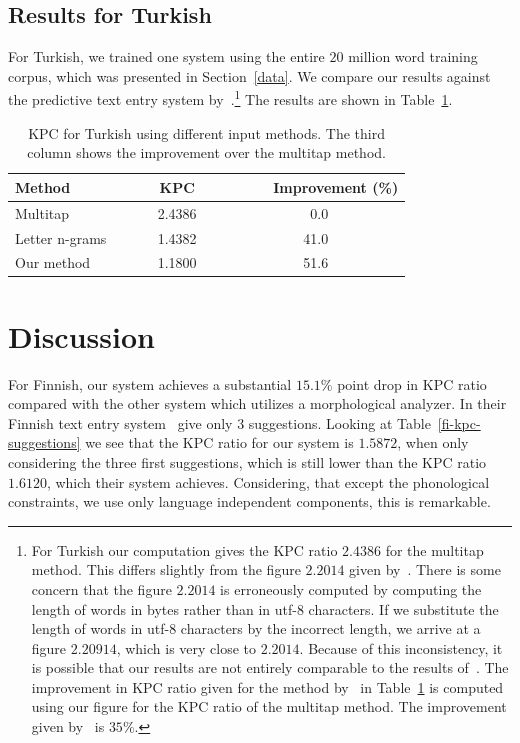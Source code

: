 \documentclass{llncs}
\begin{document}
\subsection{Results for Turkish}

For Turkish, we trained one system using the entire $20$ million word
training corpus, which was presented in Section~\ref{data}. We compare
our results against the predictive text entry system
by~\cite{Tantug:2010}.\footnote{For Turkish our computation gives the
  KPC ratio $2.4386$ for the multitap method. This differs slightly
  from the figure $2.2014$ given by~\cite{Tantug:2010}. There is some
  concern that the figure $2.2014$ is erroneously computed by
  computing the length of words in bytes rather than in utf-8
  characters. If we substitute the length of words in utf-8 characters
  by the incorrect length, we arrive at a figure $2.20914$, which is
  very close to $2.2014$. Because of this inconsistency, it is
  possible that our results are not entirely comparable to the results
  of~\cite{Tantug:2010}. The improvement in KPC ratio given for the
  method by~\cite{Tantug:2010} in Table~\ref{Turkish-kpc-table} is
  computed using our figure for the KPC ratio of the multitap
  method. The improvement given by~\cite{Tantug:2010} is $35\%$.} The
results are shown in Table~\ref{Turkish-kpc-table}.

\begin{table}
\caption{KPC for Turkish using different input methods. The third
  column shows the improvement over the multitap method.}\label{Turkish-kpc-table}
\begin{center}
\begin{tabular}{lcr}
\hline
Method~~~~& ~~~~KPC~~~~ & ~~~~Improvement (\%)\\
\hline
Multitap                          &  2.4386 &0.0~~~~~~~~~~\\
Letter n-grams~\cite{Tantug:2010} &  1.4382 &41.0~~~~~~~~~~\\
Our method                        &  1.1800 &51.6~~~~~~~~~~\\
\hline
\end{tabular}
\end{center}
\end{table}

\section{Discussion}\label{discussion}

For Finnish, our system achieves a substantial $15.1\%$ point drop in KPC
ratio compared with the other system which utilizes a morphological
analyzer. In their Finnish text entry
system~\cite{silfverberg/2011/cla} give only $3$ suggestions. Looking
at Table~\ref{fi-kpc-suggestions} we see that the KPC ratio for our
system is $1.5872$, when only considering the three first suggestions,
which is still lower than the KPC ratio $1.6120$, which their system
achieves. Considering, that except the phonological constraints, we
use only language independent components, this is remarkable.
\end{document}
